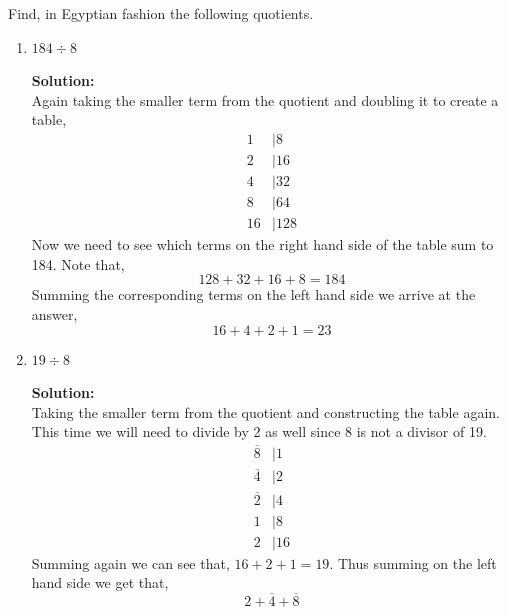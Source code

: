 \documentclass[12pt]{article}
\makeatletter
\theoremstyle{homework}
\newenvironment{exercise}[1]
{\def\@currentlabel{#1}\exercisecore}
{\endexercisecore}
\newcommand{\localhead}[1]{\par\smallskip\noindent\textbf{#1}\nobreak\\}%
\newcommand\solution{\localhead{Solution:}}
\makeatother
\begin{document}
\begin{exercise}{2} Find, in Egyptian fashion the following quotients. \\
    \begin{enumerate}
        \item $184 \div 8$
        \solution Again taking the smaller term from the quotient and doubling it to create a table,
        \begin{align*}
            1 &|8\\
            2 &|16\\
            4 &|32\\
            8 &|64\\
            16 &|128
        \end{align*}
        Now we need to see which terms on the right hand side of the table sum to 184. Note that,
        \begin{equation*}
            128 + 32 + 16 + 8 = 184
        \end{equation*}
        Summing the corresponding terms on the left hand side we arrive at the answer, 
        \begin{equation*}
            16 + 4 + 2 + 1 = 23
        \end{equation*}
    
    \item $19 \div 8$
    \solution Taking the smaller term from the quotient and constructing the table again. This time we will need
    to divide by 2 as well since 8 is not a divisor of 19.
    \begin{align*}
        \overline{8} &|1\\ 
        \overline{4} &|2\\ 
        \overline{2} &|4\\ 
        1 &|8\\
        2 &|16
    \end{align*}
    Summing again we can see that, $16 + 2 + 1 = 19$. Thus summing on the left hand side we get that, 
    \begin{equation*}
        2 + \overline{4} + \overline{8}
    \end{equation*}
\end{enumerate}
    
\end{exercise}
    
\end{document}
